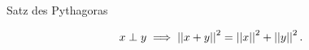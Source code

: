 \documentclass[class=article, crop=false]{standalone}
\begin{document}
\begin{zettel}{Satz des Pythagoras}
\begin{flashcard}
\begin{theorem}
\[
x \perp y \implies \left|\left|x+y\right|\right|^2 = \left|\left|x\right|\right|^2 + \left|\left|y\right|\right|^2
.\]
\end{theorem}
\end{flashcard}
\end{zettel}
\end{document}
